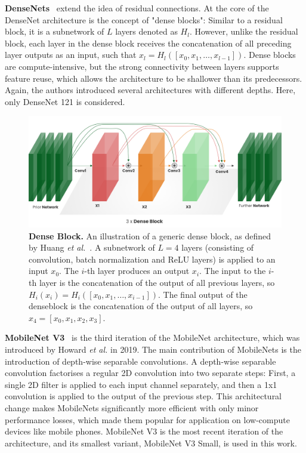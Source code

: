 \documentclass[a4paper]{article}
\begin{document}
\textbf{DenseNets}~\cite{densenet} extend the idea of residual connections. At
the core of the DenseNet architecture is the concept of "dense blocks": Similar
to a residual block, it is a subnetwork of $L$ layers denoted as $H_l$. However,
unlike the residual block, each layer in the dense block receives the
concatenation of all preceding layer outputs as an input, such that $x_l =
H_l([x_0, x_1, \dots, x_{l-1}])$. Dense blocks are compute-intensive, but the
strong connectivity between layers supports feature reuse, which allows the
architecture to be shallower than its predecessors. Again, the authors
introduced several architectures with different depths. Here, only DenseNet 121
is considered.

\begin{figure}
  \centering
  \includegraphics[width=.8\textwidth]{./figures/densenet.png}
  \caption{\textbf{Dense Block.} An illustration of a generic dense block, as
    defined by Huang \textit{et al.}~\cite{densenet}. A subnetwork of $L=4$ layers
    (consisting of convolution, batch normalization and ReLU layers) is applied
    to an input $x_0$. The $i$-th layer produces an output $x_i$. The input to
    the $i$-th layer is the concatenation of the output of all previous layers,
    so $H_i(x_i) = H_i([x_0, x_1, \dots, x_{i-1}])$. The final output of the
    denseblock is the concatenation of the output of all layers, so $x_4 = [x_0,
  x_1, x_2, x_3]$. }
  \label{fig:denseblock}
\end{figure}

\textbf{MobileNet V3}~\cite{mobilenetv3} is the third iteration of the MobileNet
architecture, which was introduced by Howard \textit{et al.} in 2019. The main
contribution of MobileNets is the introduction of depth-wise separable
convolutions. A depth-wise separable convolution factorises a regular 2D
convolution into two separate steps: First, a single 2D filter is applied to
each input channel separately, and then a 1x1 convolution is applied to the
output of the previous step. This architectural change makes MobileNets
significantly more efficient with only minor performance losses, which made them
popular for application on low-compute devices like mobile phones. MobileNet V3
is the most recent iteration of the architecture, and its smallest variant,
MobileNet V3 Small, is used in this work.
\end{document}
